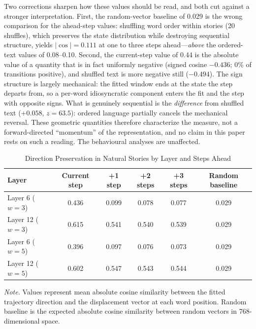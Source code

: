 \documentclass[12pt]{article}
\newcommand{\new}[1]{#1}   %
\begin{document}
\new{Two corrections sharpen how these values should be read, and both cut against a stronger interpretation. First, the random-vector baseline of 0.029 is the wrong comparison for the ahead-step values: shuffling word order within stories (20 shuffles), which preserves the state distribution while destroying sequential structure, yields $|\cos| = 0.111$ at one to three steps ahead---\emph{above} the ordered-text values of 0.08--0.10. Second, the current-step value of 0.44 is the absolute value of a quantity that is in fact uniformly negative (signed cosine $-0.436$; 0\% of transitions positive), and shuffled text is more negative still ($-0.494$). The sign structure is largely mechanical: the fitted window ends at the state the step departs from, so a per-word idiosyncratic component enters the fit and the step with opposite signs. What is genuinely sequential is the \emph{difference} from shuffled text ($+0.058$, $z = 63.5$): ordered language partially cancels the mechanical reversal. These geometric quantities therefore characterize the measure, not a forward-directed ``momentum'' of the representation, and no claim in this paper rests on such a reading. The behavioural analyses are unaffected.}

\begin{table}[!htbp]
\centering
\caption{Direction Preservation in Natural Stories by Layer and Steps Ahead}
\label{tab:direction}
\begin{tabular}{lccccc}
\toprule
\textbf{Layer} & \textbf{Current step} & \textbf{+1 step} & \textbf{+2 steps} & \textbf{+3 steps} & \textbf{Random baseline} \\
\midrule
Layer 6 ($w = 3$) & \new{0.436} & \new{0.099} & \new{0.078} & \new{0.077} & 0.029 \\
Layer 12 ($w = 3$) & \new{0.615} & \new{0.541} & \new{0.540} & \new{0.539} & 0.029 \\
Layer 6 ($w = 5$) & \new{0.396} & \new{0.097} & \new{0.076} & \new{0.073} & 0.029 \\
Layer 12 ($w = 5$) & \new{0.602} & \new{0.547} & \new{0.543} & \new{0.544} & 0.029 \\
\bottomrule
\end{tabular}

\smallskip
\footnotesize
\textit{Note.} Values represent mean absolute cosine similarity between the fitted trajectory direction and the displacement vector at each word position. Random baseline is the expected absolute cosine similarity between random vectors in 768-dimensional space.
\end{table}
\end{document}
